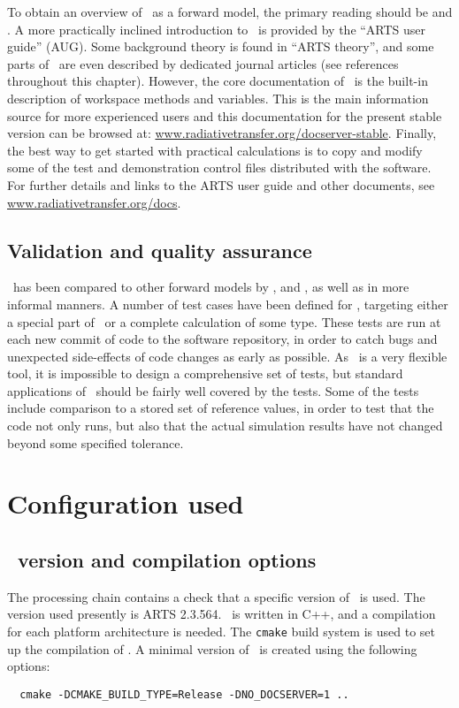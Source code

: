 To obtain an overview of \ARTS\ as a forward model, the primary reading should
be \citet{buehler:artst:05} and \citet{eriksson:arts2:11}. A more practically
inclined introduction to \ARTS\ is provided by the ``ARTS user guide'' (AUG).
Some background theory is found in ``ARTS theory'', and some parts of \ARTS\
are even described by dedicated journal articles (see references throughout
this chapter). However, the core documentation of \ARTS\ is the built-in
description of workspace methods and variables. This is the main information
source for more experienced users and this documentation for the present stable
version can be browsed at: \url{www.radiativetransfer.org/docserver-stable}.
Finally, the best way to get started with practical calculations is to copy and
modify some of the test and demonstration control files distributed with the
software. For further details and links to the ARTS user guide and other
documents, see \url{www.radiativetransfer.org/docs}.



\subsection{Validation and quality assurance}
%
\ARTS\ has been compared to other forward models by
\citet{melsheimer:inter:05}, \citet{buehler2006radiative} and
\citet{saunders07:_atmos_infrar_sound_airs_jgr}, as well as in more informal
manners. A number of test cases have been defined for \ARTS, targeting either a
special part of \ARTS\ or a complete calculation of some type. These tests are
run at each new commit of code to the software repository, in order to catch
bugs and unexpected side-effects of code changes as early as possible. As
\ARTS\ is a very flexible tool, it is impossible to design a comprehensive set
of tests, but standard applications of \ARTS\ should be fairly well covered by
the tests. Some of the tests include comparison to a stored set of reference
values, in order to test that the code not only runs, but also that the actual
simulation results have not changed beyond some specified tolerance.


\section{Configuration used}
\label{sec:arts:config}

\subsection{\ARTS\ version and compilation options}
%
The processing chain contains a check that a specific version of \ARTS\ is
used. The version used presently is ARTS 2.3.564. \ARTS\
is written in C++, and a compilation for each platform architecture is needed. The
\texttt{cmake} build system is used to set up the compilation of \ARTS. A
minimal version of \ARTS\ is created using the following options:
\begin{verbatim}
  cmake -DCMAKE_BUILD_TYPE=Release -DNO_DOCSERVER=1 ..
\end{verbatim}


